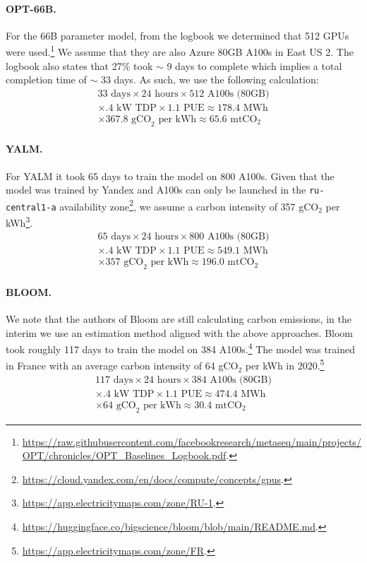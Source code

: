 \paragraph{OPT-66B.} For the 66B parameter model, from the logbook we determined that 512 GPUs were used.\footnote{\url{https://raw.githubusercontent.com/facebookresearch/metaseq/main/projects/OPT/chronicles/OPT_Baselines_Logbook.pdf}.} We assume that they are also Azure 80GB A100s in East US 2. The logbook also states that 27\% took $\sim$ 9 days to complete which implies a total completion time of $\sim$ 33 days. As such, we use the following calculation:
\begin{align*}
    33 \text{ days} \times 24 \text{ hours} \times \text{$512$ A100s (80GB)} \\ 
    \times .4 \text{ kW TDP}\times 1.1 \text{ PUE} \approx 178.4 \text{ MWh}\\
    \times 367.8 \text{ gCO}_\text{2} \text{ per kWh}  \approx 65.6\text{ mtCO}_\text{2}
\end{align*}

\paragraph{YALM.} For YALM it took 65 days to train the model on 800 A100s. Given that the model was trained by Yandex and A100s can only be launched in the \texttt{ru-central1-a} availability zone\footnote{\url{https://cloud.yandex.com/en/docs/compute/concepts/gpus}.}, we assume a carbon intensity of  357 gCO$_\text{2}$ per kWh\footnote{\url{https://app.electricitymaps.com/zone/RU-1}.}.
\begin{align*}
    65 \text{ days} \times 24 \text{ hours} \times \text{$800$ A100s (80GB)} \\ 
    \times .4 \text{ kW TDP}\times 1.1 \text{ PUE} \approx 549.1 \text{ MWh}\\
    \times 357 \text{ gCO}_\text{2} \text{ per kWh}  \approx 196.0 \text{ mtCO}_\text{2}
\end{align*}

\paragraph{BLOOM.} We note that the authors of Bloom are still calculating carbon emissions, in the interim we use an estimation method aligned with the above approaches. Bloom took roughly 117 days to train the model on 384 A100s.\footnote{\url{https://huggingface.co/bigscience/bloom/blob/main/README.md}.} The model was trained in France with an average carbon intensity of 64 gCO$_\text{2}$ per kWh in 2020.\footnote{\url{https://app.electricitymaps.com/zone/FR}.}
\begin{align*}
    117 \text{ days} \times 24 \text{ hours} \times \text{$384$ A100s (80GB)} \\ 
    \times .4 \text{ kW TDP}  \times 1.1 \text{ PUE} \approx  474.4\text{ MWh} \\
     \times 64 \text{ gCO}_\text{2} \text{ per kWh} \approx 30.4 \text{ mtCO}_\text{2}
\end{align*}


